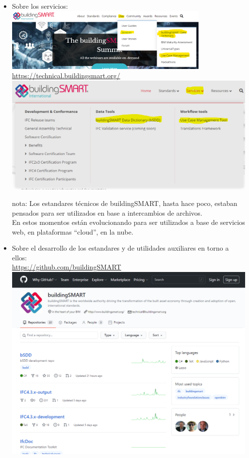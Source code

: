 \documentclass[spanish,10pt,a4paper,final,oneside]{article}
\begin{document}
\begin{itemize}
\item Sobre los servicios:
\\ \includegraphics[width=0.8\textwidth]{web - User - Services}
\\ \url{https://technical.buildingsmart.org/}
\\ \includegraphics[width=\textwidth]{web - technical - Services}

nota: Los estandares técnicos de buildingSMART, hasta hace poco, estaban pensados para ser utilizados en base a intercambios de archivos.
\\En estos momentos están evolucionando para ser utilizados a base de servicios web, en plataformas ``cloud'', en la nube.

\item Sobre el desarrollo de los estandares y de utilidades auxiliares en torno a ellos:
\\ \url{https://github.com/buildingSMART}
\\ \includegraphics[width=\textwidth]{GitHub - pagina principal de buildingSMART}

\end{itemize}
\end{document}
